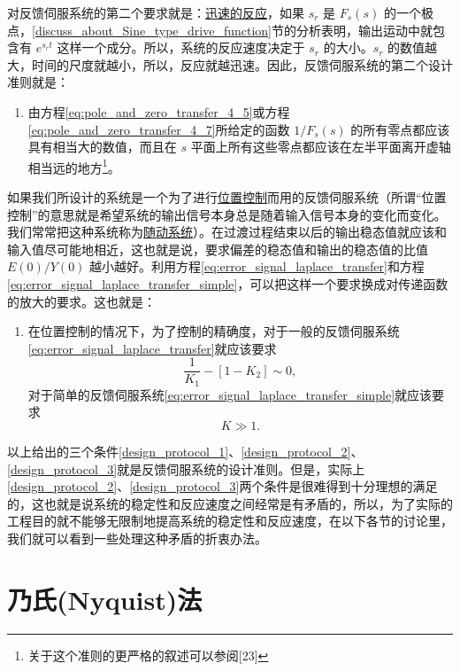 对反馈伺服系统的第二个要求就是：\underline{迅速的反应}，如果 $s_r$ 是 $F_s(s)$ 的一个极点，\ref{discuss_about_Sine_type_drive_function}节的分析表明，输出运动中就包含有 $e^{s_rt}$ 这样一个成分。所以，系统的反应速度决定于 $s_r$ 的大小。$s_r$ 的数值越大，时间的尺度就越小，所以，反应就越迅速。因此，反馈伺服系统的第二个设计准则就是：
\begin{enumerate}[label=(\arabic*), start=2]
\item \label{design_protocol_2} 由方程\eqref{eq:pole_and_zero_transfer_4_5}或方程\eqref{eq:pole_and_zero_transfer_4_7}所给定的函数 $1/F_s(s)$ 的所有零点都应该具有相当大的数值，而且在 $s$ 平面上所有这些零点都应该在左半平面离开虚轴相当远的地方\footnote{关于这个准则的更严格的叙述可以参阅[23]}。
\end{enumerate}

如果我们所设计的系统是一个为了进行\underline{位置控制}而用的反馈伺服系统（所谓“位置控制”的意思就是希望系统的输出信号本身总是随着输入信号本身的变化而变化。我们常常把这种系统称为\underline{随动系统}）。在过渡过程结束以后的输出稳态值就应该和输入值尽可能地相近，这也就是说，要求偏差的稳态值和输出的稳态值的比值 $E(0)/Y(0)$ 越小越好。利用方程\eqref{eq:error_signal_laplace_transfer}和方程\eqref{eq:error_signal_laplace_transfer_simple}，可以把这样一个要求换成对传递函数的放大的要求。这也就是：

\begin{enumerate}[label=(\arabic*), start=3]
\item \label{design_protocol_3} 在位置控制的情况下，为了控制的精确度，对于一般的反馈伺服系统\eqref{eq:error_signal_laplace_transfer}就应该要求
\begin{equation}\label{eq:ch4_condition_of_param_k1_k2}
    \frac{1}{K_1} - [1-K_2] \sim 0,
\end{equation}
对于简单的反馈伺服系统\eqref{eq:error_signal_laplace_transfer_simple}就应该要求
\begin{equation}
    K \gg 1.
\end{equation}
\end{enumerate}


以上给出的三个条件\ref{design_protocol_1}、\ref{design_protocol_2}、\ref{design_protocol_3}就是反馈伺服系统的设计准则。但是，实际上 \ref{design_protocol_2}、\ref{design_protocol_3}两个条件是很难得到十分理想的满足的，这也就是说系统的稳定性和反应速度之间经常是有矛盾的，所以，为了实际的工程目的就不能够无限制地提高系统的稳定性和反应速度，在以下各节的讨论里，我们就可以看到一些处理这种矛盾的折衷办法。


\section{乃氏(Nyquist)法}\label{nyquist_method}


